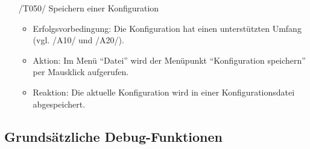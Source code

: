 \documentclass[parskip=full]{scrartcl}
\begin{document}
\begin{itemize}
	\item[/T050/] Speichern einer Konfiguration
		\begin{itemize}
		\item Erfolgsvorbedingung: Die Konfiguration hat einen unterstützten Umfang (vgl. /A10/ und /A20/).
		\item Aktion: Im Menü \enquote{Datei} wird der Menüpunkt \enquote{Konfiguration speichern} per Mausklick aufgerufen.
		\item Reaktion:	Die aktuelle Konfiguration wird in einer Konfigurationsdatei abgespeichert.
		\end{itemize}	
	
	\end{itemize}

\subsection{Grundsätzliche Debug-Funktionen}
\end{document}
